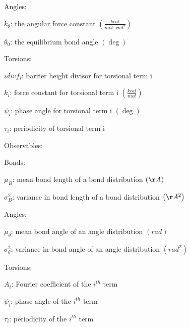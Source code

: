 \documentclass{report}
\begin{document}
\begin{outline}
\begin{outline}
\begin{outline}
        \item{Angles:}
          \begin{outline}
            \item{$k_{\theta}$: the angular force constant $\left(\frac{kcal}{mol \cdot rad^2} \right)$}
            \item{$\theta_0$: the equilibrium bond angle $\left(\deg \right)$}
          \end{outline}
        \item{Torsions:}
          \begin{outline}
            \item{$idivf_{\mathit{i}}$: barrier height divisor for torsional term i}
            \item{$k_{\mathit{i}}$: force constant for torsional term i $\left(\frac{kcal}{mol} \right)$}
            \item{$\psi_{\mathit{i}}$: phase angle for torsional term i $\left(\deg \right)$}
            \item{$\tau_{\mathit{i}}$: periodicity of torsional term i}
          \end{outline}
      \end{outline}
    \item{Observables:}
      \begin{outline}
        \item{Bonds:}
          \begin{outline}
            \item{$\mu_{B}$: mean bond length of a bond distribution $\left(\AA \right)$}
            \item{$\sigma_{B}^2$: variance in bond length of a bond distribution $\left(\AA^2 \right)$}
          \end{outline}
        \item{Angles:}
          \begin{outline}
            \item{$\mu_{\theta}$: mean bond angle of an angle distribution $\left(rad \right)$}
            \item{$\sigma_{\theta}^2$: variance in bond angle of an angle distribution $\left(rad^2 \right)$}
          \end{outline}
        \item{Torsions:}
          \begin{outline}
            \item{$A_{\mathit{i}}$: Fourier coefficient of the $i^{th}$ term}
            \item{$\psi_{\mathit{i}}$: phase angle of the $i^{th}$ term} 
            \item{$\tau_{\mathit{i}}$: periodicity of the $i^{th}$ term}
          \end{outline}
      \end{outline}
    \end{outline}   
  \end{outline} 
\end{document}
